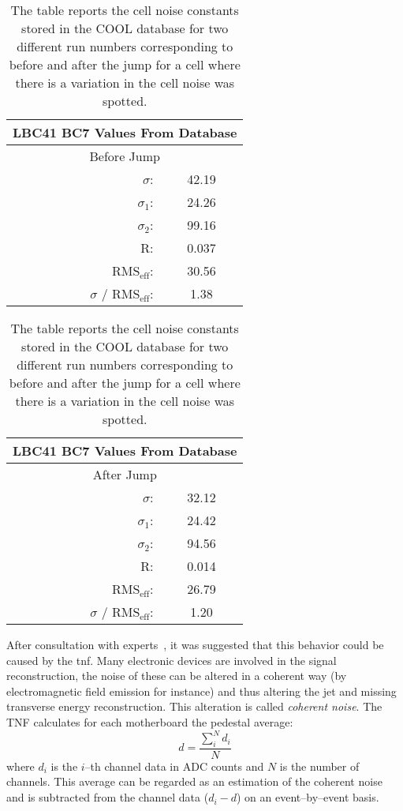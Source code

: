 \begin{table}[!h]
  \centering
  \begin{tabular}{r c}
    \toprule
    \multicolumn{2}{c}{LBC41 BC7 Values From Database} \\
    \midrule \midrule
    \multicolumn{2}{c}{Before Jump} \\
    \midrule
    $\sigma$: & 42.19 \\
    $\sigma_1$: & 24.26 \\
    $\sigma_2$: & 99.16 \\
    R\@: & 0.037 \\
    RMS$_{\text{eff}}$: & 30.56 \\
    $\sigma$ / RMS$_{\text{eff}}$: & 1.38 \\
    \bottomrule
  \end{tabular} \quad
  \begin{tabular}{r c}
    \toprule
    \multicolumn{2}{c}{LBC41 BC7 Values From Database} \\
    \midrule \midrule
    \multicolumn{2}{c}{After Jump} \\
    \midrule
    $\sigma$: & 32.12 \\
    $\sigma_1$: & 24.42 \\
    $\sigma_2$: & 94.56 \\
    R\@: & 0.014 \\
    RMS$_{\text{eff}}$: & 26.79 \\
    $\sigma$ / RMS$_{\text{eff}}$: & 1.20 \\
    \bottomrule
  \end{tabular}
  \caption{The table reports the cell noise constants stored in the COOL
    database for two different run numbers corresponding to before and after the
  jump for a cell where there is a variation in the cell noise was spotted.}
  \label{tab:jump_fit}
\end{table}

After consultation with experts~\cite{PrivateConv}, it was suggested that this
behavior could be caused by the \gls{tnf}. Many electronic devices are involved
in the signal reconstruction, the noise of these can be altered in a coherent
way (by electromagnetic field emission for instance) and thus altering the jet
and missing transverse energy reconstruction. This alteration is called
\emph{coherent noise}. The TNF calculates for each motherboard the pedestal
average:
\begin{equation}
  \label{eq:92}
  d = \frac{\sum_i^N d_i}{N}
\end{equation}
where $d_i$ is the $i$--th channel data in ADC counts and $N$ is the number of
channels. This average can be regarded as an estimation of the coherent noise
and is subtracted from the channel data ($d_i - d$) on an event--by--event
basis.

